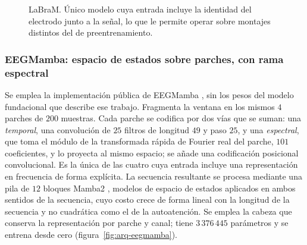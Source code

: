 \begin{figure}[H]
\centering
{}
\caption{LaBraM. Único modelo cuya entrada incluye la identidad del electrodo junto a la señal, lo
que le permite operar sobre montajes distintos del de preentrenamiento.}
\label{fig:arq-labram}
\end{figure}

\subsubsection{EEGMamba: espacio de estados sobre parches, con rama espectral}

Se emplea la implementación pública de EEGMamba \cite{wang2025eegmamba}, sin los pesos del
modelo fundacional que describe ese trabajo. Fragmenta la ventana en los mismos $4$
parches de $200$ muestras. Cada parche se codifica
por dos vías que se suman: una \emph{temporal}, una convolución de $25$ filtros de
longitud $49$ y paso $25$, y una
\emph{espectral}, que toma el módulo de la transformada rápida de Fourier real del parche,
$101$ coeficientes, y lo proyecta al mismo espacio; se añade una codificación posicional
convolucional. Es la única de las cuatro cuya entrada incluye
una representación en frecuencia de forma explícita. La secuencia resultante se procesa
mediante una pila de $12$ bloques Mamba2 \cite{gu2023mamba,dao2024mamba2}, modelos de
espacio de estados aplicados en ambos sentidos de la secuencia, cuyo
costo crece de forma lineal con la longitud de la secuencia y no cuadrática como el de la
autoatención. Se emplea la cabeza que conserva la representación por parche y canal;
tiene $3\,376\,445$ parámetros y se entrena desde cero
(figura~\ref{fig:arq-eegmamba}).

